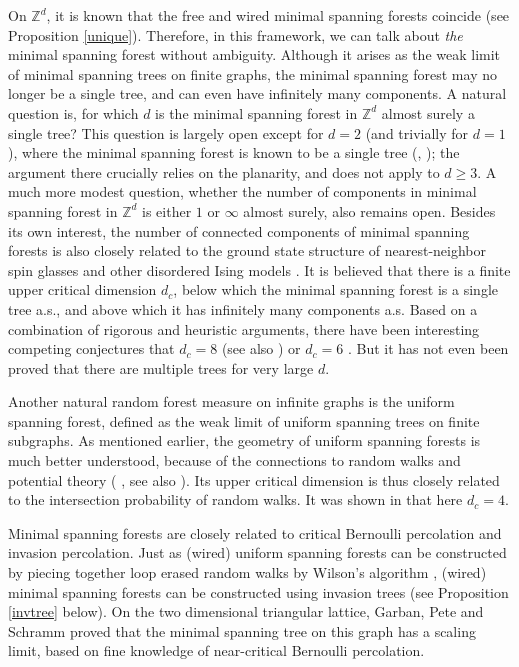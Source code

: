 \documentclass[12pt, twoside,a4paper,reqno]{amsart}
\theoremstyle{plain}
\theoremstyle{remark}
\theoremstyle{definition}
\begin{document}
On $\mathbb{Z}^{d}$, it is known that the free and wired minimal spanning
forests coincide (see Proposition \ref{unique}). Therefore, in this framework,
we can talk about \emph{the} minimal spanning forest without ambiguity. Although
it arises as the weak limit of minimal spanning trees on finite graphs, the
minimal spanning forest may no longer be a single tree, and can even have
infinitely many components. A natural question is, for which $d$ is the minimal
spanning forest in $\mathbb{Z}^{d}$ almost surely a single tree? This question
is largely open except for $d=2$ (and trivially for $d=1$), where the minimal
spanning forest is known to be a single tree (\cite{CCN}, \cite{AM}); the argument there
crucially relies on the planarity, and does not apply to $d\geq 3$. A much more
modest question, whether the number of components in minimal spanning forest in
$\mathbb{Z}^{d}$ is either $1$ or $\infty $ almost surely, also remains open.
Besides its own interest, the number of connected components of minimal spanning
forests is also closely related to the ground state structure of
nearest-neighbor spin glasses and other disordered Ising models \cite{NS}. It is
believed that there is a finite upper critical dimension $d_{c}$, below which
the minimal spanning forest is a single tree a.s., and above which it has
infinitely many components a.s. Based on a combination of rigorous and heuristic
arguments, there have been interesting competing conjectures that $d_{c}=8$
\cite{NS} (see also \cite{NS94}) or $d_{c}=6$ \cite{Jack}. But it has not even been proved that there are
multiple trees for very large $d$.

Another natural random forest measure on infinite graphs is the uniform
spanning forest, defined as the weak limit of uniform spanning trees on
finite subgraphs. As mentioned earlier, the geometry of uniform spanning forests
is much better
understood, because of the connections to random walks and potential theory (%
\cite{Wil}, see also \cite{BLPS}). Its upper critical dimension is thus
closely related to the intersection probability of random walks. It was
shown in \cite{Pem} that here $d_{c}=4$.

Minimal spanning forests are closely related to critical Bernoulli percolation
and invasion percolation. Just as (wired) uniform spanning forests can be
constructed by piecing together loop erased random walks by Wilson's algorithm \cite{Wil},
(wired) minimal spanning forests can be constructed using invasion trees (see
Proposition \ref{invtree} below). On the two dimensional triangular lattice,
Garban, Pete and Schramm \cite{GPS} proved that the minimal spanning tree on
this graph has a scaling limit, based on fine knowledge of near-critical
Bernoulli percolation.
\end{document}
